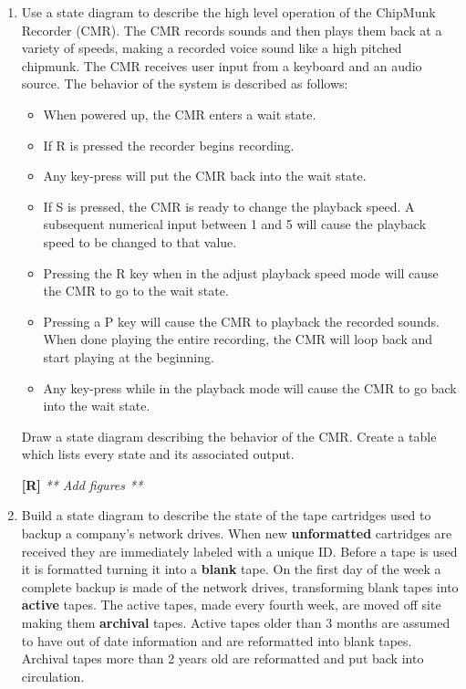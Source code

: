 \begin{enumerate}
  \item
    Use a state diagram to describe the high level operation of the
    ChipMunk Recorder (CMR). The CMR records sounds and then plays them
    back at a variety of speeds, making a recorded voice sound like a
    high pitched chipmunk. The CMR receives user input from a keyboard
    and an audio source. The behavior of the system is described as
    follows:
\begin{itemize}
\item
  When powered up, the CMR enters a wait state.
\item
  If \textquotesingle R\textquotesingle{} is pressed the recorder begins
  recording.
\item
  Any key-press will put the CMR back into the wait state.
\item
  If \textquotesingle S\textquotesingle{} is pressed, the CMR is ready
  to change the playback speed. A subsequent numerical input between 1
  and 5 will cause the playback speed to be changed to that value.
\item
  Pressing the \textquotesingle R\textquotesingle{} key when in the
  adjust playback speed mode will cause the CMR to go to the wait state.
\item
  Pressing a \textquotesingle P\textquotesingle{} key will cause the CMR
  to playback the recorded sounds. When done playing the entire
  recording, the CMR will loop back and start playing at the beginning.
\item
  Any key-press while in the playback mode will cause the CMR to go back
  into the wait state.
\end{itemize}

  Draw a state diagram describing the behavior of the CMR. Create a
  table which lists every state and its associated output.

  \begin{onlysolution}
    \textbf{[R]}
    \itshape
    ** Add figures **
  \end{onlysolution}

  \item
  \label{problem:stateDiagramTapeCartridges}
    Build a state diagram to describe the state of the tape cartridges
    used to backup a company's network drives. When new
    \textbf{unformatted} cartridges are received they are immediately
    labeled with a unique ID. Before a tape is used it is formatted
    turning it into a \textbf{blank} tape. On the first day of the week
    a complete backup is made of the network drives, transforming blank
    tapes into \textbf{active} tapes. The active tapes, made every
    fourth week, are moved off site making them \textbf{archival} tapes.
    Active tapes older than 3 months are assumed to have out of date
    information and are reformatted into blank tapes. Archival tapes
    more than 2 years old are reformatted and put back into circulation.


\end{enumerate}
